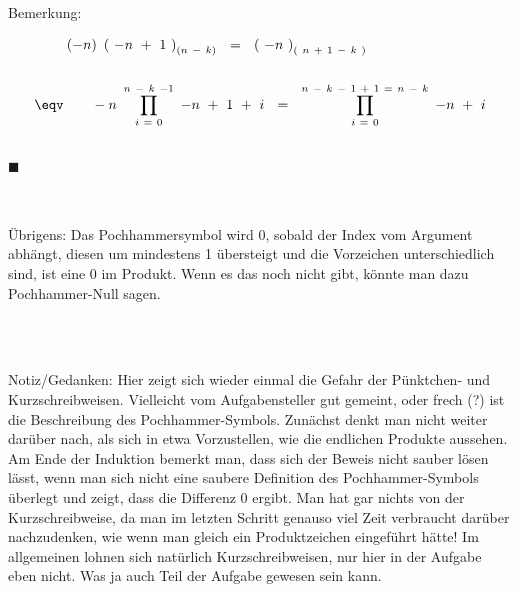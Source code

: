 Bemerkung: \setcounter{tc}{0}

\begin{align*}
	&~ \qquad (-n) ~ \left( ~ -n ~ + ~ 1 ~ \right)_{(n ~ - ~ k)} ~~ = ~~ \left( ~ -n ~ \right)_{( ~ n ~ + ~ 1 ~ - ~ k ~ )} \\ \\
	&\eqv \qquad -n ~ \prod_{i ~ = ~ 0}^{n ~ - ~ k ~ - 1} ~ -n ~ + ~ 1 ~ + ~ i ~~ = ~~ \prod_{i ~ = ~ 0}^{n ~ - ~ k ~ - ~ 1 ~ + ~ 1 ~ = ~ n ~ - ~ k} ~ -n ~ + ~ i
\end{align*}

~\\

$\blacksquare$

~\\
~\\

Übrigens: Das Pochhammersymbol wird 0, sobald der Index vom Argument abhängt, diesen um mindestens 1 übersteigt und die Vorzeichen unterschiedlich sind, ist eine 0 im Produkt. Wenn es das noch nicht gibt, könnte man dazu Pochhammer-Null sagen.

	
	
	\newpage
	
	~\\
	~\\
	
	
	\newpage
	
	
	Notiz/Gedanken: Hier zeigt sich wieder einmal die Gefahr der Pünktchen- und Kurzschreibweisen. Vielleicht vom Aufgabensteller gut gemeint, oder frech (?) ist die Beschreibung des Pochhammer-Symbols.
	Zunächst denkt man nicht weiter darüber nach, als sich in etwa Vorzustellen, wie die endlichen Produkte aussehen. Am Ende der Induktion bemerkt man, dass sich der Beweis nicht sauber lösen lässt, wenn man sich nicht eine saubere Definition des Pochhammer-Symbols überlegt und zeigt, dass die Differenz 0 ergibt. Man hat gar nichts von der Kurzschreibweise, da man im letzten Schritt genauso viel Zeit verbraucht darüber nachzudenken, wie wenn man gleich ein Produktzeichen eingeführt hätte! Im allgemeinen lohnen sich natürlich Kurzschreibweisen, nur hier in der Aufgabe eben nicht. Was ja auch Teil der Aufgabe gewesen sein kann.




